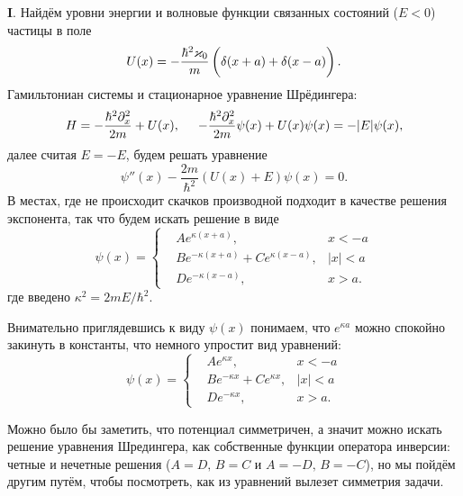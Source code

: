 

\textbf{I}. Найдём уровни энергии и волновые функции связанных состояний ($E<0$) частицы в поле
\begin{equation*}
    U(x) = - \frac{\hbar^2 \kappa_0}{m} \left( \bp
        \delta(x+a)+\delta(x-a)
    \right).
\end{equation*}
Гамильтониан системы и стационарное уравнение Шрёдингера:
\begin{equation*}
    H = - \frac{\hbar^2 \partial_x^2}{2m} + U(x),
    \hspace{5 mm}
    - \frac{\hbar^2 \partial_x^2}{2m} \psi(x) + U(x) \psi(x) = - |E| \psi(x),
\end{equation*}
далее считая $E = - E$, будем решать уравнение
\begin{equation*}
    \psi''(x) - \frac{2m}{\hbar^2} (U(x) + E) \psi(x) = 0.
\end{equation*}
В местах, где не происходит скачков производной подходит в качестве решения экспонента, так что будем искать решение в виде
\begin{equation*}
    \psi(x) = \left\{\begin{aligned}
        &A e^{\kappa (x+a)}, &x<-a \\
        &B e^{-\kappa(x+a)} + C e^{\kappa(x-a)}, &|x| < a \\
        &D e^{-\kappa (x-a)}, &x > a.
    \end{aligned}\right.
\end{equation*}
где введено $\kappa^2 = {2 m E}/{\hbar^2}$. 

Внимательно приглядевшись к виду $\psi(x)$ понимаем, что $e^{\kappa a}$ можно спокойно закинуть в константы, что немного упростит вид уравнений:
\begin{equation*}
    \psi(x) = \left\{\begin{aligned}
        &A e^{\kappa x}, &x<-a \\
        &B e^{-\kappa x} + C e^{\kappa x}, &|x| < a \\
        &D e^{-\kappa x}, &x > a.
    \end{aligned}\right.
\end{equation*}


Можно было бы заметить, что потенциал симметричен, а значит можно искать решение уравнения Шредингера, как собственные функции оператора инверсии: четные и нечетные решения ($A=D,\, B=C$ и $A=-D,\, B=-C$), но мы пойдём другим путём, чтобы посмотреть, как из уравнений вылезет симметрия задачи.


